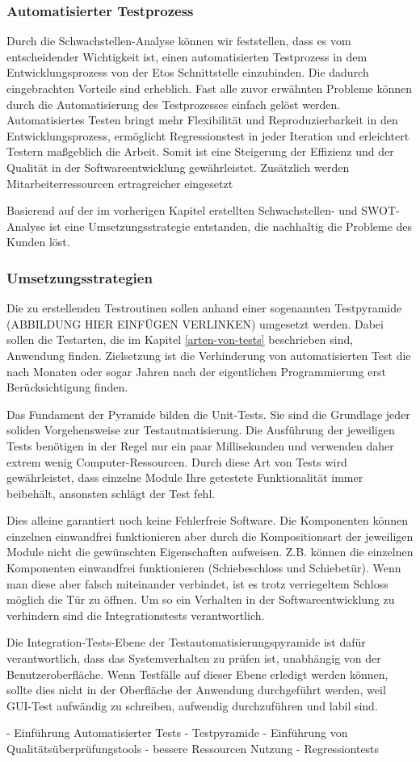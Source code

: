 \subsubsection{Automatisierter Testprozess}
Durch die Schwachstellen-Analyse können wir feststellen, dass es vom entscheidender Wichtigkeit ist, einen automatisierten Testprozess in dem Entwicklungsprozess von der Etos Schnittstelle einzubinden. Die dadurch eingebrachten Vorteile sind erheblich. Fast alle zuvor erwähnten Probleme können durch die Automatisierung des Testprozesses einfach gelöst werden. Automatisiertes Testen bringt mehr Flexibilität und Reproduzierbarkeit in den Entwicklungsprozess, ermöglicht Regressionstest in jeder Iteration und erleichtert Testern maßgeblich die Arbeit. Somit ist eine Steigerung der Effizienz und der Qualität in der Softwareentwicklung gewährleistet. Zusätzlich werden Mitarbeiterressourcen ertragreicher eingesetzt

Basierend auf der im vorherigen Kapitel erstellten Schwachstellen- und SWOT-Analyse ist eine Umsetzungsstrategie entstanden, die nachhaltig die Probleme des Kunden löst.

\subsubsection{Umsetzungsstrategien}
Die zu erstellenden Testroutinen sollen anhand einer sogenannten Testpyramide (ABBILDUNG HIER EINFÜGEN VERLINKEN) umgesetzt werden. Dabei sollen die Testarten, die im Kapitel \ref{arten-von-tests} beschrieben sind, Anwendung finden. Zielsetzung ist die Verhinderung von automatisierten Test die nach Monaten oder sogar Jahren nach der eigentlichen Programmierung erst Berücksichtigung finden.

Das Fundament der Pyramide bilden die Unit-Tests. Sie sind die Grundlage jeder soliden Vorgehensweise zur Testautmatisierung. Die Ausführung der jeweiligen Tests benötigen in der Regel nur ein paar Millisekunden und verwenden daher extrem wenig Computer-Ressourcen. Durch diese Art von Tests wird gewährleistet, dass einzelne Module Ihre getestete Funktionalität immer beibehält, ansonsten schlägt der Test fehl. 

Dies alleine garantiert noch keine Fehlerfreie Software. Die Komponenten können einzelnen einwandfrei funktionieren aber durch die Kompositionsart der jeweiligen Module nicht die gewünschten Eigenschaften aufweisen. Z.B. können die einzelnen Komponenten einwandfrei funktionieren (Schiebeschloss und Schiebetür). Wenn man diese aber falsch miteinander verbindet, ist es trotz verriegeltem Schloss möglich die Tür zu öffnen. Um so ein Verhalten in der Softwareentwicklung zu verhindern sind die Integrationstests verantwortlich. 

Die Integration-Tests-Ebene der Testautomatisierungspyramide ist dafür verantwortlich, dass das
Systemverhalten zu prüfen ist, unabhängig von der Benutzeroberfläche. Wenn Testfälle auf dieser
Ebene erledigt werden können, sollte dies nicht in der Oberfläche der Anwendung durchgeführt
werden, weil GUI-Test aufwändig zu schreiben, aufwendig durchzuführen und labil sind. 

- Einführung Automatisierter Tests
- Testpyramide
- Einführung von Qualitätsüberprüfungstools 
- bessere Ressourcen Nutzung
- Regressiontests

